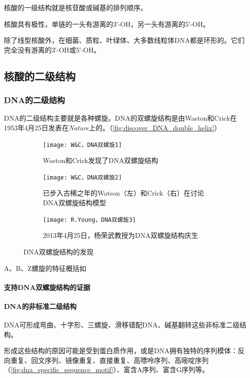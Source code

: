 核酸的一级结构就是核苷酸或碱基的排列顺序。

核酸具有极性，单链的一头有游离的3′-OH，另一头有游离的5′-OH。

除了线型核酸外，在细菌、质粒、叶绿体、大多数线粒体DNA都是环形的。它们完全没有游离的3′-OH或5′-OH。

\subsection{核酸的二级结构}

\subsubsection{DNA的二级结构}

DNA的二级结构主要就是各种螺旋。DNA的双螺旋结构是由Waston和Crick在1953年4月25日发表在\textit{Nature}上的。（\autoref{fig:discover_DNA_double_helix}）

\begin{figure}[htbp]
	\centering
	\begin{subfigure}{0.3\textwidth}
		\texttt{[image: W\&C，DNA双螺旋1]}
		\caption{Waston和Crick发现了DNA双螺旋结构}
	\end{subfigure}
	\hfill
	\begin{subfigure}{0.3\textwidth}
		\texttt{[image: W\&C，DNA双螺旋2]}
		\caption{已步入古稀之年的Watson（左）和Crick（右）在讨论DNA双螺旋结构模型}
	\end{subfigure}
	\hfill
	\begin{subfigure}{0.3\textwidth}
		\texttt{[image: R.Young，DNA双螺旋3]}
		\caption{2013年4月25日，杨荣武教授为DNA双螺旋结构庆生}
	\end{subfigure}
	\caption{DNA双螺旋结构的发现}
	\label{fig:discover_DNA_double_helix}
\end{figure}

A、B、Z螺旋的特征概括如


\paragraph{支持DNA双螺旋结构的证据}

\paragraph{DNA的非标准二级结构}

DNA可形成弯曲、十字形、三螺旋、滑移错配DNA、碱基翻转这些非标准二级结构。

形成这些结构的原因可能是受到蛋白质作用，或是DNA拥有独特的序列模体：反向重复、回文序列、镜像重复、直接重复、高嘌呤序列、高嘧啶序列（\autoref{fig:dna_specific_sequence_motif}）、富含A序列、富含G序列等。

